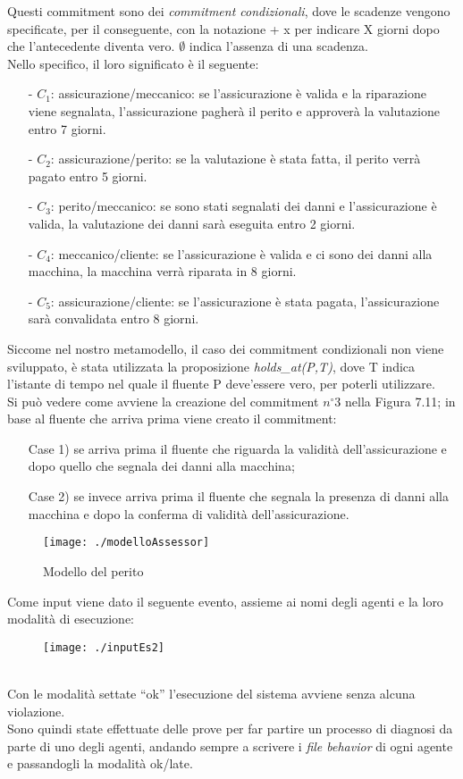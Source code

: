 \documentclass[a4paper,12pt]{report}
\newcommand{\virgolette}[1]{``#1''}
\begin{document}
\newpage
Questi commitment sono dei \textit{commitment condizionali}, dove le scadenze vengono specificate, per il conseguente, con la notazione + x per indicare X giorni dopo che l'antecedente diventa vero. $\emptyset$ indica l'assenza di una scadenza.\\
Nello specifico, il loro significato è il seguente:
\begin{enumerate}
    \item[-] $C_1$: assicurazione/meccanico: se l'assicurazione è valida e la riparazione viene segnalata, l'assicurazione pagherà il perito e approverà la valutazione entro 7 giorni.
    \item[-] $C_2$: assicurazione/perito: se la valutazione è stata fatta, il perito verrà pagato entro 5 giorni.
    \item[-] $C_3$: perito/meccanico: se sono stati segnalati dei danni e l'assicurazione è valida, la valutazione dei danni sarà eseguita entro 2 giorni.
    \item[-] $C_4$: meccanico/cliente: se l'assicurazione è valida e ci sono dei danni alla macchina, la macchina verrà riparata in 8 giorni.
    \item[-] $C_5$: assicurazione/cliente: se l'assicurazione è stata pagata, l'assicurazione sarà convalidata entro 8 giorni.
\end{enumerate}
Siccome nel nostro metamodello, il caso dei commitment condizionali non viene sviluppato, è stata utilizzata la proposizione \textit{holds\_at(P,T)}, dove T indica l'istante di tempo nel quale il fluente P deve'essere vero, per poterli utilizzare.\\
Si può vedere come avviene la creazione del commitment $n^{\circ}3$ nella Figura 7.11; in base al fluente che arriva prima viene creato il commitment:
\begin{enumerate}
    \item[Case 1)] se arriva prima il fluente che riguarda la validità dell'assicurazione e dopo quello che segnala dei danni alla macchina;
    \item[Case 2)] se invece arriva prima il fluente che segnala la presenza di danni alla macchina e dopo la conferma di validità dell'assicurazione.
\end{enumerate}
\newpage
\begin{figure}[h]
    \texttt{[image: ./modelloAssessor]}
    \caption{Modello del perito}
\end{figure}
\newpage
Come input viene dato il seguente evento, assieme ai nomi degli agenti e la loro modalità di esecuzione:
\begin{figure}[h]
    \texttt{[image: ./inputEs2]}
\end{figure}
\\Con le modalità settate \virgolette{ok} l'esecuzione del sistema avviene senza alcuna violazione.
\\Sono quindi state effettuate delle prove per far partire un processo di diagnosi da parte di uno degli agenti, andando sempre a scrivere i \textit{file behavior} di ogni agente e passandogli la modalità ok/late.
\end{document}
